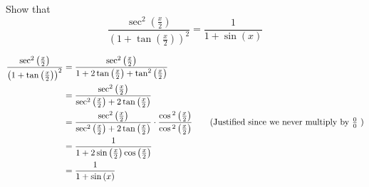 \begin{exercise}
    Show that 
    \[ \frac{ \sec^{2}{ \left( \frac{x}{2} \right) }}{ \left( 1+ \tan{ \left( \frac{x}{2} \right) } \right)^{2}} = \frac{1}{1+ \sin{ \left( x \right) }} \]
\end{exercise}
\begin{solution}
    \begin{align*}
        \frac{ \sec^{2}{ \left( \frac{x}{2} \right) }}{ \left( 1+ \tan{ \left( \frac{x}{2} \right) } \right)^{2}} &= \frac{ \sec^{2}{ \left( \frac{x}{2} \right) }}{1 + 2 \tan{ \left( \frac{x}{2} \right) } + \tan^{2}{ \left( \frac{x}{2} \right) }} \\
    &= \frac{\sec^{2}{ \left( \frac{x}{2} \right) }}{\sec^{2}{ \left( \frac{x}{2} \right) } + 2 \tan{ \left( \frac{x}{2} \right) }} \\
     &= \frac{\sec^{2}{ \left( \frac{x}{2} \right) }}{\sec^{2}{ \left( \frac{x}{2} \right) } + 2 \tan{ \left( \frac{x}{2} \right) }} \cdot \frac{ \cos{^{2} \left( \frac{x}{2} \right) }}{\cos{^{2} \left( \frac{x}{2} \right) }} \tag{Justified since we never multiply by $\frac{0}{0}$ } \\
     &= \frac{1}{1 + 2 \sin{ \left( \frac{x}{2} \right) } \cos{ \left( \frac{x}{2} \right) }} \\
     &= \frac{1}{1+ \sin{ \left(x \right) }}
    \end{align*}
    
\end{solution}
